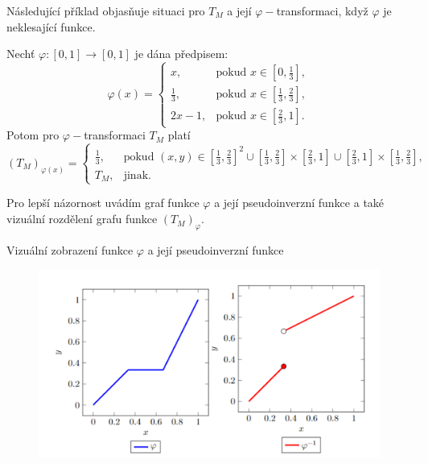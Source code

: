   
  N\'asleduj\'ic\'i p\v r\'iklad objas\v nuje situaci pro $T_M$ a jej\'i $\varphi-$transformaci, kdy\v z $\varphi$ je neklesaj\'ic\'i funkce. 
\begin{example}
\label{sub: fi}
Nech\v t $\varphi:[0,1] \to [0,1]$ je d\'ana p\v redpisem:    
 $$\varphi(x) = \begin{cases} x, & \mbox {pokud } x \in [0,\frac{1}{3}],
    \\ \frac{1}{3}, & \mbox {pokud } x \in [\frac{1}{3}, \frac{2}{3}],\\
    2x - 1, & \mbox {pokud } x \in [\frac{2}{3}, 1].
    \end{cases}$$
Potom pro $\varphi-$transformaci $T_M$ plat\'i
$$(T_M)_{\varphi(x)} = \begin{cases} \frac{1}{3}, & \mbox {pokud } (x, y) \in [\frac{1}{3},\frac{2}{3}]^2 \cup [\frac{1}{3}, \frac{2}{3}] \times [\frac{2}{3}, 1] \cup [\frac{2}{3}, 1] \times [\frac{1}{3}, \frac{2}{3}],\\
    T_M, & \mbox {jinak.}
    \end{cases}$$
\end{example}
Pro lep\v s\'i n\'azornost uv\'ad\'im graf  funkce $\varphi$ a jej\'i pseudoinverzn\'i funkce a tak\'e vizu\'aln\'i rozd\v elen\'i grafu funkce $\left(T_M\right)_\varphi.$\\
\begin{graph}
    Vizu\' aln\' i zobrazení funkce $\varphi$ a jej\'i pseudoinverzn\'i funkce
\begin{figure}[H]
                \hspace{-1cm}
                \includegraphics[scale=0.75]{template-fig/phi_transform.pdf}
                \centering
            \end{figure}
\end{graph}

